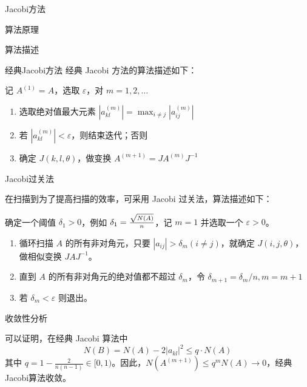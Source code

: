 \documentclass[a4paper]{article}
\begin{document}
\begin{multicols}{2}
\begin{section}{Jacobi方法}
\begin{subsection}{算法原理}
	\end{subsection}
		
	\begin{subsection}{算法描述}	
	
		\begin{subsubsection}{经典Jacobi方法}
			经典 Jacobi 方法的算法描述如下：
			
			记 $A^{(1)} = A$，选取 $\varepsilon$，对 $m=1,2,\dots$
			
			\begin{enumerate}
				\item 选取绝对值最大元素 $\left|a_{k l}^{(m)}\right|=\max _{i \neq j}\left|a_{i j}^{(m)}\right|$
				\item 若 $\left|a_{k l}^{(m)}\right|<\varepsilon $，则结束迭代；否则
				\item 确定 $J(k,l,\theta)$，做变换 $A^{(m+1)}=J A^{(m)} J^{-1}$
			\end{enumerate}
		\end{subsubsection}
		
		\begin{subsubsection}{Jacobi过关法}
		
			在扫描到为了提高扫描的效率，可采用 Jacobi 过关法，算法描述如下：
			
			确定一个阈值 $\delta_1 > 0$，例如 $\delta_1 = {\sqrt{N(A)}\over n}$，记 $m=1$ 并选取一个 $\varepsilon > 0$。
			
			\begin{enumerate}
				\item 循环扫描 $A$ 的所有非对角元，只要 $|a_{ij}|>\delta_m (i\neq j)$，就确定 $J(i,j,\theta)$，做相似变换 $JAJ^{-1}$。
				\item 直到 $A$ 的所有非对角元的绝对值都不超过 $\delta_m$，令 $\delta_{m+1} = \delta_m / n, m=m+1$
				\item 若 $\delta_m < \varepsilon$ 则退出。
			\end{enumerate}

			
			
		\end{subsubsection}
		
	\end{subsection}
		
	\begin{subsection}{收敛性分析}

		可以证明，在经典 Jacobi 算法中 $$ N(B)=N(A)-2\left|a_{k l}\right|^{2} \leq q \cdot N(A) $$ 其中 $q=1-\frac{2}{n(n-1)} \in[0,1)$。因此，$N\left(A^{(m+1)}\right) \leq q^{m} N(A) \rightarrow 0$，经典 Jacobi算法收敛。
		

\end{subsection}
\end{section}
\end{multicols}
\end{document}
